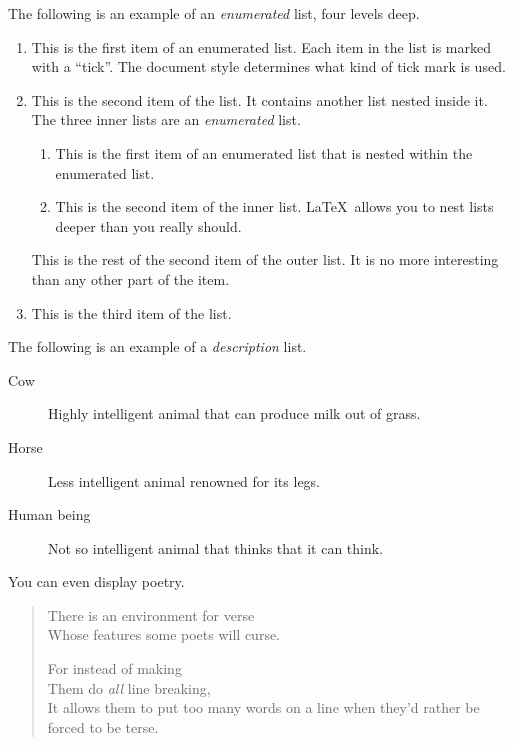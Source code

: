 \documentclass[ejs]{imsart}
\numberwithin{equation}{section}
\theoremstyle{plain}
\theoremstyle{definition}
\theoremstyle{remark}
\begin{document}
The following is an example of an {\em enumerated} list, four levels deep.
\begin{enumerate}
\item  This is the first item of an enumerated list.  Each item
      in the list is marked with a ``tick''.  The document
      style determines what kind of tick mark is used.
\item  This is the second item of the list.  It contains another
      list nested inside it.  The three inner lists are an {\em enumerated}
      list.
    \begin{enumerate}
       \item This is the first item of an enumerated list that
            is nested within the enumerated list.
          \item This is the second item of the inner list.  \LaTeX\
            allows you to nest lists deeper than you really should.
      \end{enumerate}
      This is the rest of the second item of the outer list.  It
      is no more interesting than any other part of the item.
   \item  This is the third item of the list.
\end{enumerate}

The following is an example of a {\em description} list.
\begin{description}
\item[Cow] Highly intelligent animal that can produce milk out of grass.
\item[Horse] Less intelligent animal renowned for its legs.
\item[Human being] Not so intelligent animal that thinks that it can think.
\end{description}

You can even display poetry.
\begin{verse}
   There is an environment for verse \\    %
   Whose features some poets will curse.   %


   For instead of making\\
   Them do {\em all\/} line breaking, \\
   It allows them to put too many words on a line when they'd
   rather be forced to be terse.
\end{verse}
\end{document}
